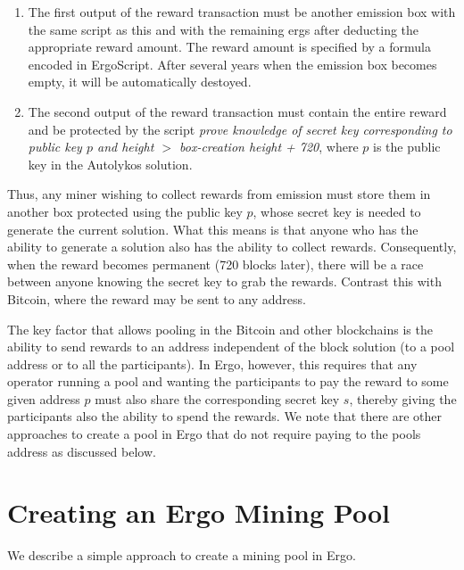 \documentclass[11pt]{article}
\newcommand{\langname}{ErgoScript\xspace}
\newcommand{\powname}{Autolykos\xspace}
\begin{document}
\begin{enumerate}
	\item The first output of the reward transaction must be another emission box with the same script as this and with the remaining ergs after deducting the appropriate reward amount. The reward amount is specified by a formula encoded in \langname. 
	After several years when the emission box becomes empty, it will be automatically destoyed.
	\item The second output of the reward transaction must contain the entire reward and be protected by the script {\em prove knowledge of secret key corresponding to public key $p$ and height $>$ box-creation height + 720}, where $p$ is the public key in the \powname solution.  
\end{enumerate}

Thus, any miner wishing to collect rewards from emission must store them in another box protected using the public key $p$, whose secret key is needed to generate the current solution. What this means is that anyone who has the ability to generate a solution also has the ability to collect rewards. Consequently, when the reward becomes permanent (720 blocks later), there will be a race between anyone knowing the secret key to grab the rewards. Contrast this with Bitcoin, where the reward may be sent to any address. 

The key factor that allows pooling in the Bitcoin and other blockchains is the ability to send rewards to an address independent of the block solution (to a pool address or to all the participants). In Ergo, however, this requires that any operator running a pool and wanting the participants to pay the reward to some given address $p$ must also share the corresponding secret key $s$, thereby giving the participants also the ability to spend the rewards.
We note that there are other approaches to create a pool in Ergo that do not require paying to the pools address as discussed below.


\section{Creating an Ergo Mining Pool}

We describe a simple approach to create a mining pool in Ergo. 
\end{document}
